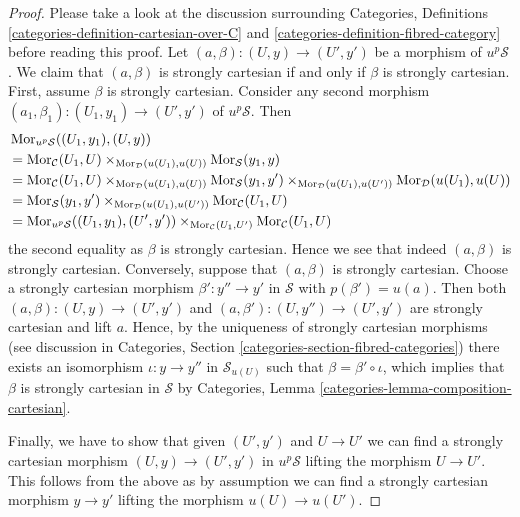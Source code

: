 \begin{proof}
Please take a look at the discussion surrounding
Categories, Definitions \ref{categories-definition-cartesian-over-C} and
\ref{categories-definition-fibred-category}
before reading this proof.
Let $(a, \beta) : (U, y) \to (U', y')$ be a morphism of $u^p\mathcal{S}$.
We claim that $(a, \beta)$ is strongly cartesian if and only if
$\beta$ is strongly cartesian. First, assume $\beta$ is strongly cartesian.
Consider any second morphism
$(a_1, \beta_1) : (U_1, y_1) \to (U', y')$ of $u^p\mathcal{S}$.
Then
\begin{align*}
& \mathop{\mathrm{Mor}}\nolimits_{u^p\mathcal{S}}((U_1, y_1), (U, y)) \\
& =
\mathop{\mathrm{Mor}}\nolimits_\mathcal{C}(U_1, U)
\times_{\mathop{\mathrm{Mor}}\nolimits_\mathcal{D}(u(U_1), u(U))}
\mathop{\mathrm{Mor}}\nolimits_\mathcal{S}(y_1, y) \\
& =
\mathop{\mathrm{Mor}}\nolimits_\mathcal{C}(U_1, U)
\times_{\mathop{\mathrm{Mor}}\nolimits_\mathcal{D}(u(U_1), u(U))}
\mathop{\mathrm{Mor}}\nolimits_\mathcal{S}(y_1, y')
\times_{\mathop{\mathrm{Mor}}\nolimits_\mathcal{D}(u(U_1), u(U'))}
\mathop{\mathrm{Mor}}\nolimits_\mathcal{D}(u(U_1), u(U)) \\
& =
\mathop{\mathrm{Mor}}\nolimits_\mathcal{S}(y_1, y')
\times_{\mathop{\mathrm{Mor}}\nolimits_\mathcal{D}(u(U_1), u(U'))}
\mathop{\mathrm{Mor}}\nolimits_\mathcal{C}(U_1, U) \\
& =
\mathop{\mathrm{Mor}}\nolimits_{u^p\mathcal{S}}((U_1, y_1), (U', y'))
\times_{\mathop{\mathrm{Mor}}\nolimits_\mathcal{C}(U_1, U')}
\mathop{\mathrm{Mor}}\nolimits_\mathcal{C}(U_1, U)
\end{align*}
the second equality as $\beta$ is strongly cartesian. Hence we see that
indeed $(a, \beta)$ is strongly cartesian. Conversely, suppose that
$(a, \beta)$ is strongly cartesian. Choose a strongly cartesian morphism
$\beta' : y'' \to y'$ in $\mathcal{S}$ with $p(\beta') = u(a)$.
Then both $(a, \beta) : (U, y) \to (U', y')$ and
$(a, \beta') : (U, y'') \to (U', y')$ are strongly cartesian and
lift $a$. Hence, by the uniqueness of strongly cartesian morphisms
(see discussion in
Categories, Section \ref{categories-section-fibred-categories})
there exists an isomorphism $\iota : y \to y''$ in $\mathcal{S}_{u(U)}$
such that $\beta = \beta' \circ \iota$, which implies that
$\beta$ is strongly cartesian in $\mathcal{S}$ by
Categories, Lemma \ref{categories-lemma-composition-cartesian}.

\medskip\noindent
Finally, we have to show
that given $(U', y')$ and $U \to U'$ we can find a strongly
cartesian morphism $(U, y) \to (U', y')$ in $u^p\mathcal{S}$
lifting the morphism $U \to U'$. This follows from the above as by assumption
we can find a strongly cartesian morphism $y \to y'$ lifting the
morphism $u(U) \to u(U')$.
\end{proof}

